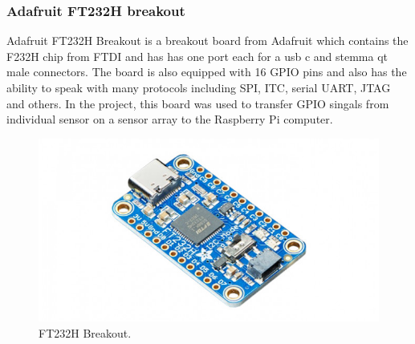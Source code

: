 \subsubsection{Adafruit FT232H breakout}
Adafruit FT232H Breakout is a breakout board from Adafruit which contains the F232H chip from FTDI and has has one port each for a usb c and stemma qt male connectors. The board is also equipped with 16 GPIO pins and also has the ability to speak with many protocols including SPI, ITC, serial UART, JTAG and others. In the project, this board was used to transfer GPIO singals from individual sensor on a sensor array to the Raspberry Pi computer.
\begin{figure}[h]
    \centering
    \includegraphics[width =\textwidth]{sections/assets/FT232H.jpg}
    \caption{FT232H Breakout.}
    \label{FT232H}
\end{figure}


